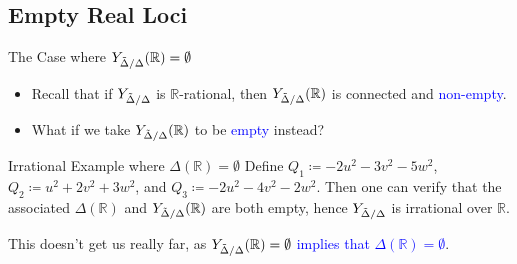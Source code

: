 \documentclass[hyperref, notheorems]{beamer}
\newcommand{\Rbb}{\mathbb{R}}
\newcommand{\txtblue}{\textcolor{blue}}
\newcommand{\Ydd}{Y_{\Tilde{\Delta} /\Delta}}
\theoremstyle{definition}
\begin{document}

\subsection{Empty Real Loci}

\begin{frame}{The Case where $\Ydd(\Rbb) = \emptyset$}
\begin{itemize}
    \item Recall that if $\Ydd$ is $\Rbb$-rational, then $\Ydd(\Rbb)$ is connected and \txtblue{non-empty}.
    \item What if we take $\Ydd(\Rbb)$ to be \txtblue{empty} instead?
\end{itemize}

\begin{block}{Irrational Example where $\Delta(\Rbb) = \emptyset$}
    Define $Q_1 \coloneqq  -2u^2 - 3v^2 - 5w^2$, $Q_2 \coloneqq u^2 + 2v^2 + 3w^2$, and $Q_3 \coloneqq -2u^2 - 4v^2 - 2w^2$. Then one can verify that the associated $\Delta(\Rbb)$ and $\Ydd(\Rbb)$ are both empty, hence $\Ydd$ is irrational over $\Rbb$.
\end{block}
    This doesn't get us really far, as \txtblue{$\Ydd(\Rbb) = \emptyset$ implies that $\Delta(\Rbb) = \emptyset$}.
\end{frame}
\end{document}
